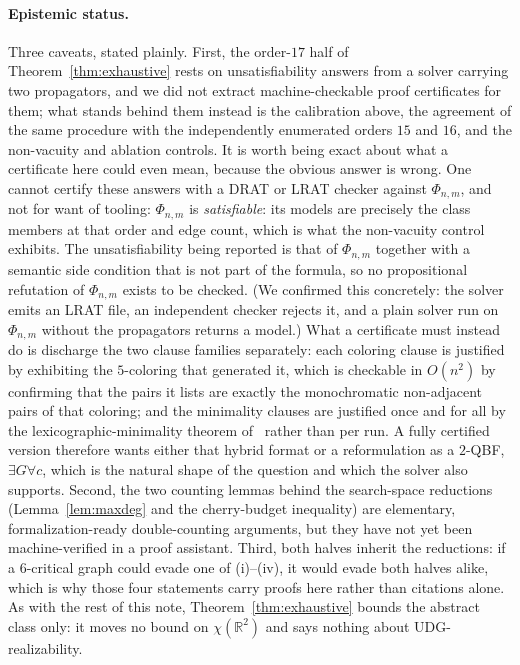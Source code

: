 \documentclass[11pt]{article}
\theoremstyle{definition}
\newcommand{\R}{\mathbb{R}}
\newcommand{\chrom}{\chi}
\begin{document}
\paragraph{Epistemic status.} Three caveats, stated plainly. First, the
order-$17$ half of Theorem~\ref{thm:exhaustive} rests on unsatisfiability
answers from a solver carrying two propagators, and we did not extract
machine-checkable proof certificates for them; what stands behind them instead is
the calibration above, the agreement of the same procedure with the independently
enumerated orders $15$ and $16$, and the non-vacuity and ablation controls. It is
worth being exact about what a certificate here could even mean, because the
obvious answer is wrong. One cannot certify these answers with a DRAT or LRAT
checker against $\Phi_{n,m}$, and not for want of tooling: $\Phi_{n,m}$ is
\emph{satisfiable}: its models are precisely the class members at that order and
edge count, which is what the non-vacuity control exhibits. The unsatisfiability
being reported is that of $\Phi_{n,m}$ together with a semantic side condition
that is not part of the formula, so no propositional refutation of $\Phi_{n,m}$
exists to be checked. (We confirmed this concretely: the solver emits an LRAT file,
an independent checker rejects it, and a plain solver run on $\Phi_{n,m}$ without
the propagators returns a model.) What a certificate must instead do is discharge
the two clause families separately: each coloring clause is justified by exhibiting
the $5$-coloring that generated it, which is checkable in $O(n^2)$ by confirming
that the pairs it lists are exactly the monochromatic non-adjacent pairs of that
coloring; and the minimality clauses are justified once and for all by the
lexicographic-minimality theorem of~\cite{KirchwegerSzeider2021} rather than per
run. A fully certified version therefore wants either that hybrid format or a
reformulation as a $2$-QBF, $\exists G \forall c$, which is the natural shape of
the question and which the solver also supports. Second, the two counting lemmas
behind the search-space reductions (Lemma~\ref{lem:maxdeg} and the
cherry-budget inequality) are elementary, formalization-ready double-counting
arguments, but they have not yet been machine-verified in a proof assistant.
Third, both halves inherit the reductions: if a $6$-critical graph could evade
one of (i)--(iv), it would evade both halves alike, which is why those four
statements carry proofs here rather than citations alone.
As with the rest of this note, Theorem~\ref{thm:exhaustive} bounds the
abstract class only: it moves no bound on $\chrom(\R^2)$ and says nothing
about UDG-realizability.
\end{document}
